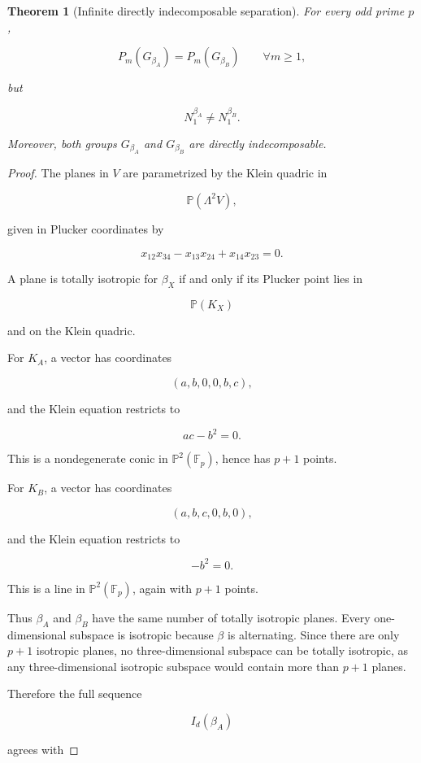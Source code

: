 \documentclass[11pt]{article}
\newtheorem{theorem}{Theorem}[section]
\begin{document}
\begin{theorem}[Infinite directly indecomposable separation]

For every odd prime $p$,

\[
P_m(G_{\beta_A})=P_m(G_{\beta_B})
\qquad
\forall m\ge1,
\]

but

\[
N_1^{\beta_A}\ne N_1^{\beta_B}.
\]

Moreover, both groups $G_{\beta_A}$ and $G_{\beta_B}$ are directly indecomposable.

\end{theorem}
\begin{proof}

The planes in $V$ are parametrized by the Klein quadric in

\[
\mathbb P(\Lambda^2V),
\]

given in Plucker coordinates by

\[
x_{12}x_{34}-x_{13}x_{24}+x_{14}x_{23}=0.
\]

A plane is totally isotropic for $\beta_X$ if and only if its Plucker point lies in

\[
\mathbb P(K_X)
\]

and on the Klein quadric.

For $K_A$, a vector has coordinates

\[
(a,b,0,0,b,c),
\]

and the Klein equation restricts to

\[
ac-b^2=0.
\]

This is a nondegenerate conic in $\mathbb P^2(\mathbb F_p)$, hence has $p+1$ points.

For $K_B$, a vector has coordinates

\[
(a,b,c,0,b,0),
\]

and the Klein equation restricts to

\[
-b^2=0.
\]

This is a line in $\mathbb P^2(\mathbb F_p)$, again with $p+1$ points.

Thus $\beta_A$ and $\beta_B$ have the same number of totally isotropic planes. Every one-dimensional subspace is isotropic because $\beta$ is alternating. Since there are only $p+1$ isotropic planes, no three-dimensional subspace can be totally isotropic, as any three-dimensional isotropic subspace would contain more than $p+1$ planes.

Therefore the full sequence

\[
I_d(\beta_A)
\]

agrees with


\end{proof}
\end{document}
